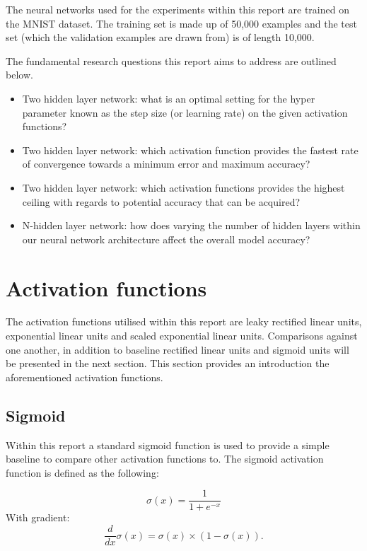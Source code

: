 \documentclass{article}
\begin{document}
The neural networks used for the experiments within this report are trained on the MNIST dataset. The training set is made up of 50,000 examples and the test set (which the validation examples are drawn from) is of length 10,000.

The fundamental research questions this report aims to address are outlined below.

\begin{itemize}
  \item Two hidden layer network: what is an optimal setting for the hyper parameter known as the step size (or learning rate) on the given activation functions?
  \item Two hidden layer network: which activation function provides the fastest rate of convergence towards a minimum error and maximum accuracy?
  \item Two hidden layer network: which activation functions provides the highest ceiling with regards to potential accuracy that can be acquired?
  \item N-hidden layer network: how does varying the number of hidden layers within our neural network architecture affect the overall model accuracy?
\end{itemize}

\section{Activation functions}
\label{sec:actfn}
The activation functions utilised within this report are leaky rectified linear units, exponential linear units\citep{clevert2015fast} and scaled exponential linear units\citep{klambauer2017self}. Comparisons against one another, in addition to baseline rectified linear units and sigmoid units will be presented in the next section. This section provides an introduction the aforementioned activation functions.

\subsection{Sigmoid}

Within this report a standard sigmoid function is used to provide a simple baseline to compare other activation functions to. The sigmoid activation function is defined as the following:

\begin{equation}
  \sigma(x) = \frac{1}{1+e^{-x}}
\end{equation}
With gradient:
\begin{equation}
  \frac{d}{dx} \sigma(x) = \sigma(x) \times (1-\sigma(x)).
\end{equation}
\end{document}
